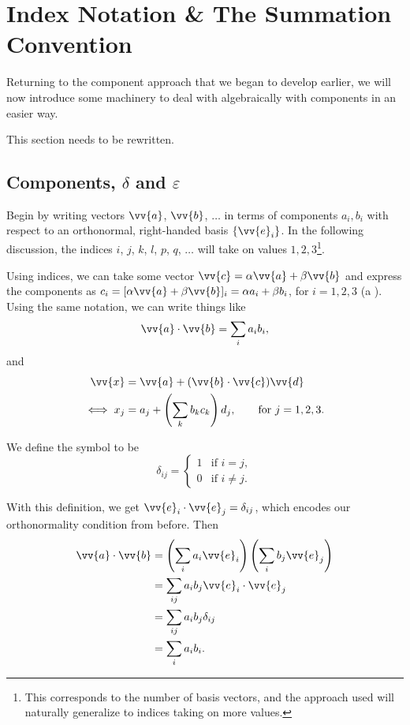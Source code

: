 \section{Index Notation \& The Summation Convention}

Returning to the component approach that we began to develop earlier, we will now introduce some machinery to deal with algebraically with components in an easier way.

{\color{red} This section needs to be rewritten.}

\subsection{Components, $\delta$ and $\varepsilon$}

Begin by writing vectors $\vv{a}$, $\vv{b}$, $\dots$ in terms of components $a_i, b_i$ with respect to an orthonormal, right-handed basis $\{\vv{e}_i\}$. In the following discussion, the indices $i$, $j$, $k$, $l$, $p$, $q$, $\dots$ will take on values $1, 2, 3$\footnote{This corresponds to the number of basis vectors, and the approach used will naturally generalize to indices taking on more values.}.

Using indices, we can take some vector $\vv{c} = \alpha \vv{a} + \beta \vv{b}$ and express the components as $c_i = [\alpha \vv{a} + \beta \vv{b}]_i = \alpha a_i + \beta b_i$, for $i = 1, 2, 3$ (a ). Using the same notation, we can write things like
$$
\vv{a} \cdot \vv{b} = \sum_i a_i b_i,
$$
and
\begin{align*}
    \vv{x} &= \vv{a} + (\vv{b} \cdot \vv{c}) \vv{d} \\
\iff x_j &= a_j + \left(\sum_k b_k c_k\right) d_j, \quad \quad \text{for }j = 1, 2, 3.
\end{align*}

\begin{definition}
    We define the  symbol to be
    $$
    \delta_{ij} = \begin{cases}
        1 &\mbox{if } i = j, \\
        0 &\mbox{if } i \neq j.
       \end{cases}
    $$
\end{definition}

With this definition, we get $\vv{e}_i \cdot \vv{e}_j = \delta_{ij}$, which encodes our orthonormality condition from before. Then
\begin{align*}
    \vv{a} \cdot \vv{b} &= \left(\sum_i a_i \vv{e}_i\right)\left(\sum_i b_j \vv{e}_j\right) \\
    &= \sum_{ij} a_i b_j \vv{e}_i \cdot \vv{e}_j \\
    &= \sum_{ij} a_i b_j \delta_{ij} \\
    &= \sum_i a_i b_i.
\end{align*}


